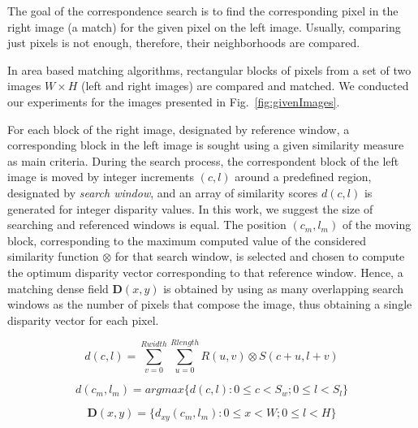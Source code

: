 \documentclass[conference]{IEEEtran}
\newcommand\fixit[1]{{\color{red}{\Large FIX:} #1}}
\begin{document}
The goal of the correspondence search is to find the corresponding pixel in the right image (a match) for the given pixel on the left image. Usually, comparing just pixels is not enough, therefore, their neighborhoods are compared.

In area based matching algorithms, rectangular blocks of pixels from a set of two images $W \times H$ (left and right images) are compared and matched. We conducted our experiments for the images presented in Fig.~\ref{fig:givenImages}. \fixit{ For each block of the right image, designated by reference window, a corresponding block in the left image is sought using a given similarity measure as main criteria. During the search process, the correspondent block of the left image is moved by integer increments $(c,l)$ around a predefined region, designated by \textit{search window}, and an array of similarity scores $d(c,l)$ is generated for integer disparity values. In this work, we suggest the size of searching and referenced windows is equal. The position $(c_m, l_m)$ of the moving block, corresponding to the maximum computed value of the considered similarity function $\otimes$ for that search window, is selected and chosen to compute the optimum disparity vector corresponding to that reference window. Hence, a matching dense field $\mathbf{D}(x,y)$ is obtained by using as many overlapping search windows as the number of pixels that compose the image, thus obtaining a single disparity vector for each pixel.




\begin{equation}
d(c,l) = \sum_{v=0}^{Rwidth}\sum_{u=0}^{Rlength}R\left(u,v\right)\otimes S\left(c+u,l+v\right)
\end{equation}

\begin{equation}
d(c_m,l_m) = argmax\{d(c,l): 0\leq c < S_w; 0\leq l < S_l \}
\end{equation}

\begin{equation}
\mathbf{D}(x,y) = \{ d_{xy}(c_m,l_m): 0\leq x < W; 0\leq l < H \}
\end{equation}

}
\end{document}
